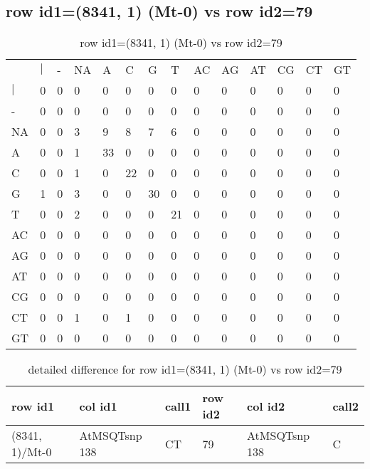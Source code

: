 \subsection{row id1=(8341, 1) (Mt-0) vs row id2=79}
\begin{center}
\begin{longtable}{|l|l|l|l|l|l|l|l|l|l|l|l|l|l|}
\caption{row id1=(8341, 1) (Mt-0) vs row id2=79} \label{table_dm354}\\
\hline
\\
\hline
&$|$&-&NA&A&C&G&T&AC&AG&AT&CG&CT&GT\\
$|$&0&0&0&0&0&0&0&0&0&0&0&0&0\\
-&0&0&0&0&0&0&0&0&0&0&0&0&0\\
NA&0&0&3&9&8&7&6&0&0&0&0&0&0\\
A&0&0&1&33&0&0&0&0&0&0&0&0&0\\
C&0&0&1&0&22&0&0&0&0&0&0&0&0\\
G&1&0&3&0&0&30&0&0&0&0&0&0&0\\
T&0&0&2&0&0&0&21&0&0&0&0&0&0\\
AC&0&0&0&0&0&0&0&0&0&0&0&0&0\\
AG&0&0&0&0&0&0&0&0&0&0&0&0&0\\
AT&0&0&0&0&0&0&0&0&0&0&0&0&0\\
CG&0&0&0&0&0&0&0&0&0&0&0&0&0\\
CT&0&0&1&0&1&0&0&0&0&0&0&0&0\\
GT&0&0&0&0&0&0&0&0&0&0&0&0&0\\
\hline
\end{longtable}
\end{center}

\begin{center}
\begin{longtable}{|l|l|l|l|l|l|}
\caption{detailed difference for row id1=(8341, 1) (Mt-0) vs row id2=79} \label{table_dm355}\\
\hline
row id1&col id1&call1&row id2&col id2&call2\\
\hline
(8341, 1)/Mt-0&AtMSQTsnp 138&CT&79&AtMSQTsnp 138&C\\
\hline
\end{longtable}
\end{center}

